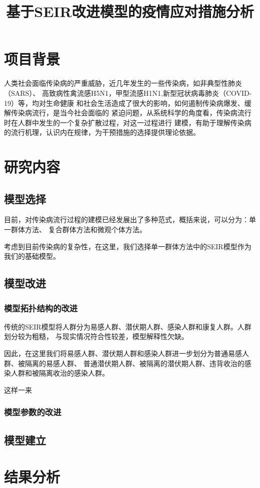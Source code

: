 \documentclass[withoutpreface,bwprint]{cumcmthesis}
\title{基于SEIR改进模型的疫情应对措施分析}
\begin{document}
\maketitle

\section{项目背景}
人类社会面临传染病的严重威胁，近几年发生的一些传染病，如非典型性肺炎（SARS）、
高致病性禽流感H5N1，甲型流感H1N1,新型冠状病毒肺炎（COVID-19）等，均对生命健康
和社会生活造成了很大的影响，如何遏制传染病爆发、缓解传染病流行，是当今社会面临的
紧迫问题，从系统科学的角度看，传染病流行时在人群中发生的一个复杂扩散过程，对这一过程进行
建模，有助于理解传染病的流行机理，认识内在规律，为干预措施的选择提供理论依据。

\section{研究内容}
\subsection{模型选择}
目前，对传染病流行过程的建模已经发展出了多种范式，概括来说，可以分为：单一群体方法、
复合群体方法和微观个体方法。
\par
考虑到目前传染病的复杂性，在这里，我们选择单一群体方法中的SEIR模型作为我们的基础模型。




\subsection{模型改进}


\subsubsection{模型拓扑结构的改进}
传统的SEIR模型将人群分为易感人群、潜伏期人群、感染人群和康复人群。人群划分较为粗糙，
与现实情况符合性较差，模型解释性欠缺。

因此，在这里我们将易感人群、潜伏期人群和感染人群进一步划分为普通易感人群、被隔离的易感人群、
普通潜伏期人群、被隔离的潜伏期人群、违背收治的感染人群和被隔离收治的感染人群。

这样一来


\subsubsection{模型参数的改进}

\subsection{模型建立}

\section{结果分析}
\end{document}
